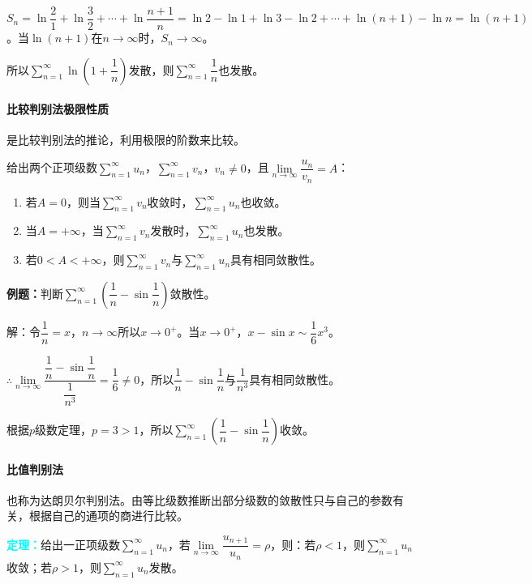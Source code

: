 $S_n=\ln\dfrac{2}{1}+\ln\dfrac{3}{2}+\cdots+\ln\dfrac{n+1}{n}=\ln2-\ln1+\ln3-\ln2+\cdots+\ln(n+1)-\ln n=\ln(n+1)$。当$\ln(n+1)$在$n\to\infty$时，$S_n\to\infty$。

所以$\sum\limits_{n=1}^\infty\ln\left(1+\dfrac{1}{n}\right)$发散，则$\sum\limits_{n=1}^\infty\dfrac{1}{n}$也发散。

\paragraph{比较判别法极限性质} \leavevmode \medskip

是比较判别法的推论，利用极限的阶数来比较。

给出两个正项级数$\sum\limits_{n=1}^\infty u_n$，$\sum\limits_{n=1}^\infty v_n$，$v_n\neq0$，且$\lim\limits_{n\to\infty}\dfrac{u_n}{v_n}=A$：

\begin{enumerate}
    \item 若$A=0$，则当$\sum\limits_{n=1}^\infty v_n$收敛时，$\sum\limits_{n=1}^\infty u_n$也收敛。
    \item 当$A=+\infty$，当$\sum\limits_{n=1}^\infty v_n$发散时，$\sum\limits_{n=1}^\infty u_n$也发散。
    \item 若$0<A<+\infty$，则$\sum\limits_{n=1}^\infty v_n$与$\sum\limits_{n=1}^\infty u_n$具有相同敛散性。
\end{enumerate}

\textbf{例题：}判断$\sum\limits_{n=1}^\infty\left(\dfrac{1}{n}-\sin\dfrac{1}{n}\right)$敛散性。

解：令$\dfrac{1}{n}=x$，$n\to\infty$所以$x\to0^+$。当$x\to0^+$，$x-\sin x\sim\dfrac{1}{6}x^3$。

$\therefore\lim\limits_{n\to\infty}\dfrac{\dfrac{1}{n}-\sin\dfrac{1}{n}}{\dfrac{1}{n^3}}=\dfrac{1}{6}\neq0$，所以$\dfrac{1}{n}-\sin\dfrac{1}{n}$与$\dfrac{1}{n^3}$具有相同敛散性。

根据$p$级数定理，$p=3>1$，所以$\sum\limits_{n=1}^\infty\left(\dfrac{1}{n}-\sin\dfrac{1}{n}\right)$收敛。

\paragraph{比值判别法} \leavevmode \medskip

也称为达朗贝尔判别法。由等比级数推断出部分级数的敛散性只与自己的参数有关，根据自己的通项的商进行比较。

\textcolor{aqua}{\textbf{定理：}}给出一正项级数$\sum\limits_{n=1}^\infty u_n$，若$\lim\limits_{n\to\infty}\dfrac{u_{n+1}}{u_n}=\rho$，则：若$\rho<1$，则$\sum\limits_{n=1}^\infty u_n$收敛；若$\rho>1$，则$\sum\limits_{n=1}^\infty u_n$发散。

